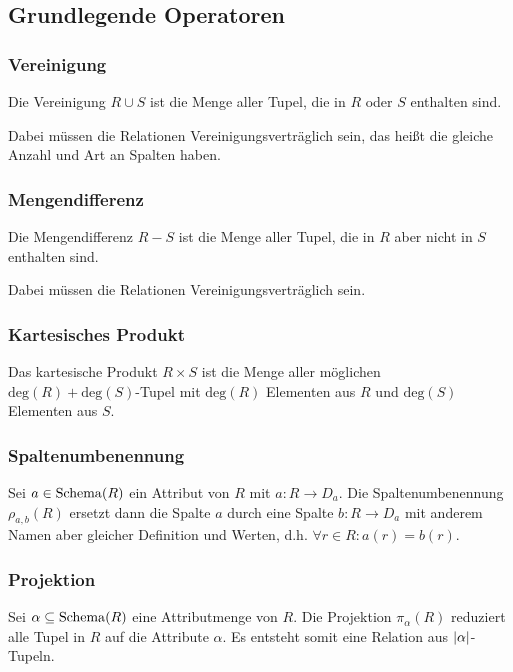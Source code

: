 		\subsection{Grundlegende Operatoren} %
			\subsubsection{Vereinigung} %
				Die Vereinigung \( R \cup S \) ist die Menge aller Tupel, die in \(R\) oder \(S\) enthalten sind.

				Dabei müssen die Relationen Vereinigungsverträglich sein, das heißt die gleiche Anzahl und Art an Spalten haben.

			\subsubsection{Mengendifferenz} %
				Die Mengendifferenz \( R - S \) ist die Menge aller Tupel, die in \(R\) aber nicht in \(S\) enthalten sind.

				Dabei müssen die Relationen Vereinigungsverträglich sein.

			\subsubsection{Kartesisches Produkt} %
				Das kartesische Produkt \( R \times S \) ist die Menge aller möglichen \( \text{deg}(R) + \text{deg}(S) \)-Tupel mit \( \text{deg}(R) \) Elementen aus \(R\) und \( \text{deg}(S) \) Elementen aus \(S\).

			\subsubsection{Spaltenumbenennung} %
				Sei \( a \in \operatorname{Schema}(R) \) ein Attribut von \(R\) mit \( a : R \rightarrow D _ a \). Die Spaltenumbenennung \( \rho_{a,b}(R) \) ersetzt dann die Spalte \(a\) durch eine Spalte \( b : R \rightarrow D _ a \) mit anderem Namen aber gleicher Definition und Werten, d.h. \( \forall r \in R : a(r) = b(r) \).

			\subsubsection{Projektion} %
				Sei \( \alpha \subseteq \operatorname{Schema}(R) \) eine Attributmenge von \(R\). Die Projektion \( \pi_\alpha(R) \) reduziert alle Tupel in \(R\) auf die Attribute \(\alpha\). Es entsteht somit eine Relation aus \(\abs{\alpha}\)-Tupeln.

